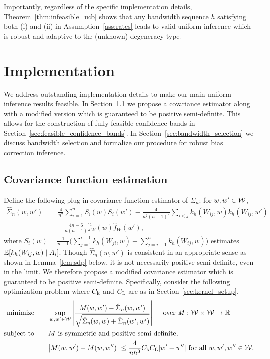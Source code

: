 Importantly, regardless of the specific implementation details,
Theorem~\ref{thm:infeasible_ucb} shows that any bandwidth sequence $h$
satisfying both (i) and (ii)
in Assumption~\ref{ass:rates} leads to valid uniform inference which is robust
and adaptive to the (unknown) degeneracy type.

\section{Implementation}\label{sec:implementation}

We address outstanding implementation details to make our main
uniform inference results feasible.
In Section~\ref{sec:covariance_estimation} we propose a covariance estimator
along with a modified version which is guaranteed to be positive semi-definite.
This allows for the construction of fully feasible confidence bands
in Section~\ref{sec:feasible_confidence_bands}.
In Section~\ref{sec:bandwidth_selection} we discuss bandwidth selection
and formalize our procedure for
robust bias correction inference.

\subsection{Covariance function estimation}
\label{sec:covariance_estimation}

Define the following plug-in covariance function
estimator of $\Sigma_n$: for $w, w' \in \mathcal{W}$,
%
\begin{align*}
  \hat \Sigma_n(w,w')
  &=
  \frac{4}{n^2}
  \sum_{i=1}^n
  S_i(w) S_i(w')
  -
  \frac{4}{n^2(n-1)^2}
  \sum_{i<j}
  k_h(W_{i j},w)
  k_h(W_{i j},w') \\
  &\quad-
  \frac{4n-6}{n(n-1)}
  \hat f_W(w)
  \hat f_W(w'),
\end{align*}
%
where
$S_i(w) = \frac{1}{n-1} \big( \sum_{j = 1}^{i-1} k_h(W_{j i}, w)
+ \sum_{j = i+1}^n k_h(W_{i j}, w) \big)$
estimates $\mathbb{E}[k_h(W_{i j},w) \mid A_i]$.
Though $\hat\Sigma_n(w,w')$ is consistent in an appropriate sense
as shown in Lemma~\ref{lem:sdp} below,
it is not necessarily positive semi-definite,
even in the limit.
We therefore propose a modified covariance estimator
which is guaranteed to be positive semi-definite.
Specifically, consider the following optimization problem
where $C_\mathrm{k}$ and $C_\mathrm{L}$ are as in Section~\ref{sec:kernel_setup}.
%
\begin{equation}
  \label{eq:sdp}
  \begin{aligned}
    \operatorname*{minimize}
    \qquad
    & \sup_{w,w' \in \mathcal{W}}
    \left|
    \frac{M(w,w') - \hat\Sigma_n(w,w')}
    {\sqrt{\hat \Sigma_n(w,w) + \hat \Sigma_n(w',w')}}
    \right|
    \quad \textup{ over } M: \mathcal{W} \times \mathcal{W} \to \mathbb{R}
    \\
    \operatorname*{subject\ to}
    \qquad
    & M \textup{ is symmetric and positive semi-definite}, \\
    & \big|M(w,w') - M(w, w'')\big|
    \leq \frac{4}{n h^3}
    C_\mathrm{k} C_\mathrm{L}
    |w'-w''|
    \textup{ for all }
    w, w', w'' \in \mathcal{W}.
  \end{aligned}
\end{equation}

